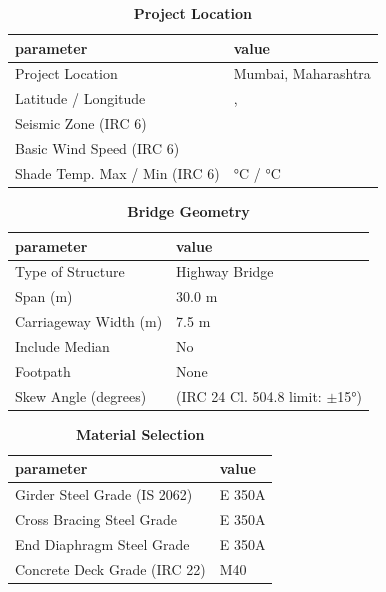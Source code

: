 \documentclass[12pt,a4paper]{report}
\numberwithin{table}{chapter}
\numberwithin{figure}{chapter}
\begin{document}
\begin{table}[H]
\caption{\textbf{Project Location}}
\label{subsec:project-location}
\begin{tabular}{|L{5.5cm}|L{8.5cm}|}
\hline
\textbf{parameter} & \textbf{value} \\
\hline
\textnormal{Project Location} & Mumbai, Maharashtra \\
\hline
\textnormal{Latitude / Longitude} & ,  \\
\hline
\textnormal{Seismic Zone (IRC 6)} &  \\
\hline
\textnormal{Basic Wind Speed (IRC 6)} &  \\
\hline
\textnormal{Shade Temp. Max / Min (IRC 6)} &  °C /  °C \\
\hline
\end{tabular}
\vspace{0.4cm}
\end{table}

\begin{table}[H]
\caption{\textbf{Bridge Geometry}}
\label{subsec:bridge-geometry}
\begin{tabular}{|L{5.5cm}|L{8.5cm}|}
\hline
\textbf{parameter} & \textbf{value} \\
\hline
\textnormal{Type of Structure} & Highway Bridge \\
\hline
\textnormal{Span (m)} & 30.0 m \\
\hline
\textnormal{Carriageway Width (m)} & 7.5 m \\
\hline
\textnormal{Include Median} & No \\
\hline
\textnormal{Footpath} & None \\
\hline
\textnormal{Skew Angle (degrees)} &  (IRC 24 Cl. 504.8 limit: $\pm$15°) \\
\hline
\end{tabular}
\end{table}
\vspace{0.4cm}

\begin{table}[H]
\caption{\textbf{Material Selection}}
\label{subsec:material}
\begin{tabular}{|L{5.5cm}|L{8.5cm}|}
\hline
\textbf{parameter} & \textbf{value} \\
\hline
\textnormal{Girder Steel Grade (IS 2062)} & E 350A \\
\hline
\textnormal{Cross Bracing Steel Grade} & E 350A \\
\hline
\textnormal{End Diaphragm Steel Grade} & E 350A \\
\hline
\textnormal{Concrete Deck Grade (IRC 22)} & M40 \\
\hline
\end{tabular}
\end{table}
\vspace{0.4cm}
\end{document}
